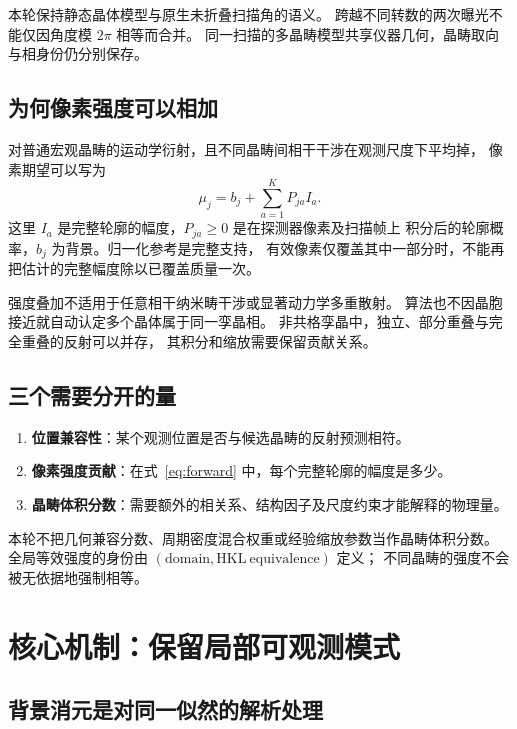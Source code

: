 \documentclass[UTF8,11pt,a4paper,fontset=fandol]{ctexart}
\begin{document}
本轮保持静态晶体模型与原生未折叠扫描角的语义。
跨越不同转数的两次曝光不能仅因角度模 $2\pi$ 相等而合并。
同一扫描的多晶畴模型共享仪器几何，晶畴取向与相身份仍分别保存。

\subsection{为何像素强度可以相加}

对普通宏观晶畴的运动学衍射，且不同晶畴间相干干涉在观测尺度下平均掉，
像素期望可以写为
\begin{equation}\label{eq:forward}
\mu_j=b_j+\sum_{a=1}^{K} P_{ja} I_a.
\end{equation}
这里 $I_a$ 是完整轮廓的幅度，$P_{ja}\geq0$ 是在探测器像素及扫描帧上
积分后的轮廓概率，$b_j$ 为背景。归一化参考是完整支持，
有效像素仅覆盖其中一部分时，不能再把估计的完整幅度除以已覆盖质量一次。

强度叠加不适用于任意相干纳米畴干涉或显著动力学多重散射。
算法也不因晶胞接近就自动认定多个晶体属于同一孪晶相。
非共格孪晶中，独立、部分重叠与完全重叠的反射可以并存，
其积分和缩放需要保留贡献关系\cite{sevvana2019}。

\subsection{三个需要分开的量}

\begin{enumerate}
\item \textbf{位置兼容性}：某个观测位置是否与候选晶畴的反射预测相符。
\item \textbf{像素强度贡献}：在式~\eqref{eq:forward} 中，每个完整轮廓的幅度是多少。
\item \textbf{晶畴体积分数}：需要额外的相关系、结构因子及尺度约束才能解释的物理量。
\end{enumerate}
本轮不把几何兼容分数、周期密度混合权重或经验缩放参数当作晶畴体积分数。
全局等效强度的身份由 $(\mathrm{domain},\mathrm{HKL\ equivalence})$ 定义；
不同晶畴的强度不会被无依据地强制相等。

\section{核心机制：保留局部可观测模式}

\subsection{背景消元是对同一似然的解析处理}
\end{document}
